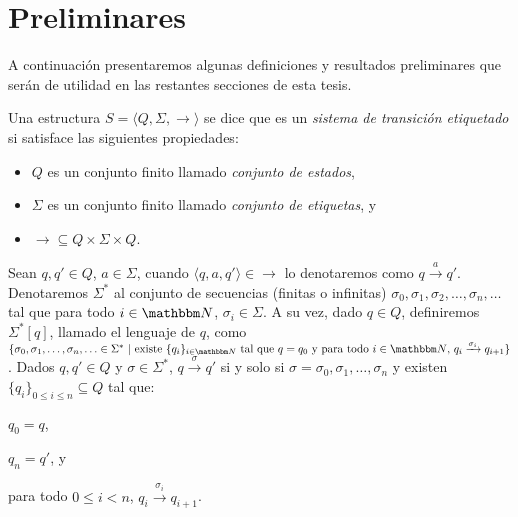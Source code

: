 \section{Preliminares}
\label{preliminares}
A continuación presentaremos algunas definiciones y resultados preliminares que serán de utilidad en las restantes secciones de esta tesis.


\begin{definition}
Una estructura $S = \langle Q, \Sigma, \longrightarrow \rangle$ se dice que es un \emph{sistema de transición etiquetado} si satisface las siguientes propiedades:
\begin{itemize}
\item $Q$ es un conjunto finito llamado \emph{conjunto de estados},
\item $\Sigma$ es un conjunto finito llamado \emph{conjunto de etiquetas}, y
\item $\longrightarrow \subseteq Q \times \Sigma \times Q$.
\end{itemize}
Sean $q, q' \in Q$, $a \in \Sigma$, cuando $\langle q, a, q' \rangle \in \longrightarrow$ lo denotaremos como $q \xrightarrow{a} q'$. Denotaremos $\Sigma^*$ al conjunto de secuencias (finitas o infinitas) $\sigma_0, \sigma_1, \sigma_2, \ldots, \sigma_n, \ldots$ tal que para todo $i \in \nat$, $\sigma_i \in \Sigma$. A su vez, dado $q \in Q$, definiremos $\Sigma^* [q]$, llamado el lenguaje de $q$, como $\{ \sigma_0, \sigma_1, \ldots, \sigma_n, \ldots \in \Sigma^*\ |\ \text{existe } \{q_i\}_{i \in \nat} \text{ tal que } q = q_0 \text{ y para todo } i \in \nat \text{, } q_i \xrightarrow{\sigma_i} q_{i+1}\}$. Dados $q, q' \in Q$ y $\sigma \in \Sigma^*$, $q \xrightarrow{\sigma} q'$ si y solo si $\sigma = \sigma_0, \sigma_1, \ldots, \sigma_n$ y existen $\{q_i\}_{0 \leq i \leq n} \subseteq Q$ tal que:
\begin{inparaenum}[1-]
\item $q_0 = q$,
\item $q_n = q'$, y
\item para todo $0 \leq i < n$, $q_i \xrightarrow{\sigma_i} q_{i+1}$.
\end{inparaenum}
\end{definition}

